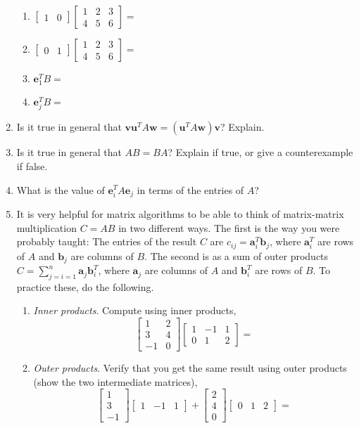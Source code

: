 \documentclass{article}
\renewcommand{\vec}[1]{\mathbf{#1}}
\newcommand{\mx}[1]{\begin{bmatrix} #1 \end{bmatrix}}
\begin{document}
\begin{enumerate}
  \begin{enumerate}
  \item $\mx{1 & 0} \mx{ 1 & 2 & 3\\ 4& 5 & 6}  = $
  \item $\mx{0 & 1} \mx{ 1 & 2 & 3\\ 4& 5 & 6}  = $
  \item $\vec{e}_1^T B = $
  \item $\vec{e}_j^TB  = $
  \end{enumerate}
\item Is it true in general that $\vec{v} \vec{u}^T A \vec{w}  =  (\vec{u}^T A \vec{w})\vec{v}$? Explain.
\item Is it true in general that  $AB = BA$?  Explain if true, or give a counterexample if false.
\item What is the value of  $\vec{e}_i^T A \vec{e}_j$ in terms of the entries of $A$?
\item It is very helpful for matrix algorithms to be able to think of matrix-matrix multiplication $C = AB$ in two different ways.  The first is the way you were probably taught: The entries of the result $C$ are $c_{ij} = \vec{a}_i^T \vec{b}_j$, where $\vec{a}_i^T$ are rows of $A$ and $\vec{b}_j$ are columns of $B$.  The second is as a sum of outer products $C = \sum_{j=i=1}^n \vec{a}_j \vec{b}_i^T$, where $\vec{a}_j$ are columns of $A$ and $\vec{b}_i^T$ are rows of $B$.  To practice these, do the following.
  \begin{enumerate}
  \item \emph{Inner products}. Compute using inner products,
    $$
  \mx{ 1 & 2 \\ 3 & 4 \\ -1 & 0} \mx{1 & -1 &1 \\ 0 & 1 & 2} = 
  $$
  \item \emph{Outer products}. Verify that you get the same result using outer products (show the two intermediate matrices),
$$
    \mx{ 1  \\ 3 \\ -1} \mx{1 & -1 &1 } +   \mx{  2 \\  4 \\ 0} \mx{0 & 1 & 2 } = 
  $$
\end{enumerate}


\end{enumerate}
\end{document}
